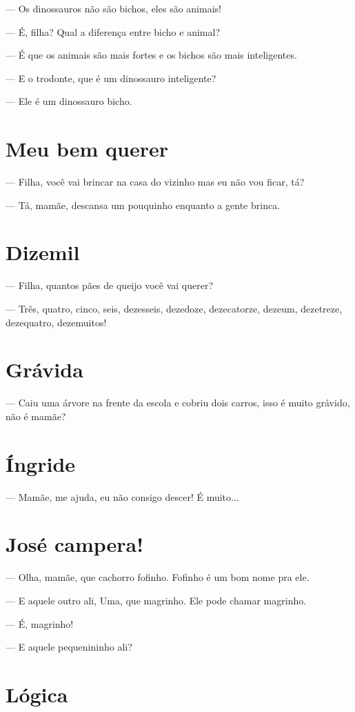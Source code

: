 {— Os dinossauros não são bichos, eles são animais!

— É, filha? Qual a diferença entre bicho e animal?

— É que os animais são mais fortes e os bichos são mais inteligentes.

— E o trodonte, que é um dinossauro inteligente?

— Ele é um dinossauro bicho.

\chapter{Meu bem querer}

— Filha, você vai brincar na casa do vizinho mas eu não vou ficar, tá?

— Tá, mamãe, descansa um pouquinho enquanto a gente brinca.

\chapter{Dizemil}

— Filha, quantos pães de queijo você vai querer?

— Três, quatro, cinco, seis, dezesseis, dezedoze, dezecatorze, dezeum,
dezetreze, dezequatro, dezemuitos!

\chapter{Grávida}

— Caiu uma árvore na frente da escola e cobriu dois carros, isso é muito
grávido, não é mamãe?

\chapter{Íngride}

— Mamãe, me ajuda, eu não consigo descer! É muito...

\chapter{José campera!}

— Olha, mamãe, que cachorro fofinho. Fofinho é um bom nome pra ele.

— E aquele outro ali, Uma, que magrinho. Ele pode chamar magrinho.

— É, magrinho!

— E aquele pequenininho ali?

\chapter{Lógica}

}
